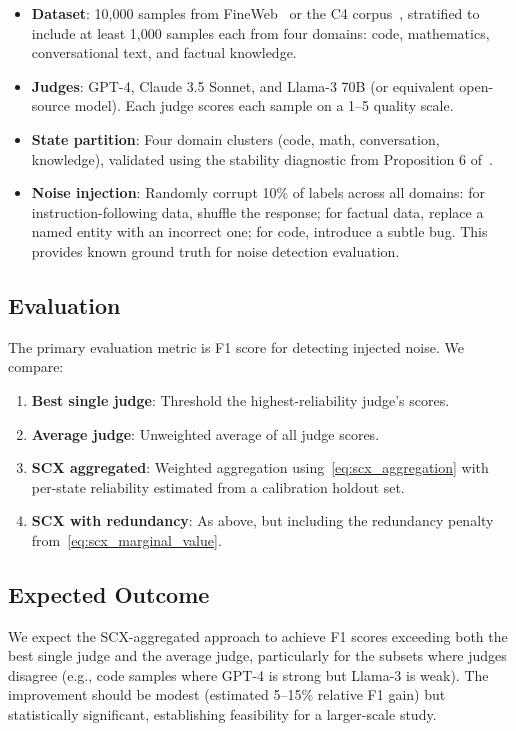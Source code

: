 \documentclass[11pt,twocolumn]{article}
\begin{document}
\begin{itemize}
    \item \textbf{Dataset}: 10,000 samples from FineWeb~\cite{penedo2023refinedweb} or the C4 corpus~\cite{raffel2020}, stratified to include at least 1,000 samples each from four domains: code, mathematics, conversational text, and factual knowledge.
    \item \textbf{Judges}: GPT-4, Claude 3.5 Sonnet, and Llama-3 70B (or equivalent open-source model). Each judge scores each sample on a 1--5 quality scale.
    \item \textbf{State partition}: Four domain clusters (code, math, conversation, knowledge), validated using the stability diagnostic from Proposition 6 of~\cite{scx2026}.
    \item \textbf{Noise injection}: Randomly corrupt 10\% of labels across all domains: for instruction-following data, shuffle the response; for factual data, replace a named entity with an incorrect one; for code, introduce a subtle bug. This provides known ground truth for noise detection evaluation.
\end{itemize}

\subsection{Evaluation}

The primary evaluation metric is F1 score for detecting injected noise. We compare:
\begin{enumerate}
    \item \textbf{Best single judge}: Threshold the highest-reliability judge's scores.
    \item \textbf{Average judge}: Unweighted average of all judge scores.
    \item \textbf{SCX aggregated}: Weighted aggregation using~\eqref{eq:scx_aggregation} with per-state reliability estimated from a calibration holdout set.
    \item \textbf{SCX with redundancy}: As above, but including the redundancy penalty from~\eqref{eq:scx_marginal_value}.
\end{enumerate}

\subsection{Expected Outcome}

We expect the SCX-aggregated approach to achieve F1 scores exceeding both the best single judge and the average judge, particularly for the subsets where judges disagree (e.g., code samples where GPT-4 is strong but Llama-3 is weak). The improvement should be modest (estimated 5--15\% relative F1 gain) but statistically significant, establishing feasibility for a larger-scale study.
\end{document}
